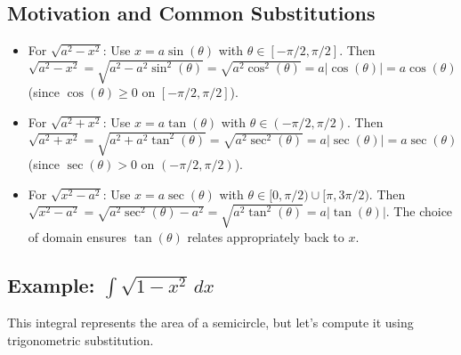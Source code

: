 \documentclass[11pt]{article}
\theoremstyle{definition}
\theoremstyle{remark}
\begin{document}
\subsection{Motivation and Common Substitutions}
\begin{itemize}
    \item For $\sqrt{a^2-x^2}$: Use $x = a\sin(\theta)$ with $\theta \in [-\pi/2, \pi/2]$. Then $\sqrt{a^2-x^2} = \sqrt{a^2-a^2\sin^2(\theta)} = \sqrt{a^2\cos^2(\theta)} = a|\cos(\theta)| = a\cos(\theta)$ (since $\cos(\theta) \ge 0$ on $[-\pi/2, \pi/2]$).
    \item For $\sqrt{a^2+x^2}$: Use $x = a\tan(\theta)$ with $\theta \in (-\pi/2, \pi/2)$. Then $\sqrt{a^2+x^2} = \sqrt{a^2+a^2\tan^2(\theta)} = \sqrt{a^2\sec^2(\theta)} = a|\sec(\theta)| = a\sec(\theta)$ (since $\sec(\theta) > 0$ on $(-\pi/2, \pi/2)$).
    \item For $\sqrt{x^2-a^2}$: Use $x = a\sec(\theta)$ with $\theta \in [0, \pi/2) \cup [\pi, 3\pi/2)$. Then $\sqrt{x^2-a^2} = \sqrt{a^2\sec^2(\theta)-a^2} = \sqrt{a^2\tan^2(\theta)} = a|\tan(\theta)|$. The choice of domain ensures $\tan(\theta)$ relates appropriately back to $x$.
\end{itemize}

\subsection{Example: \texorpdfstring{$\int \sqrt{1-x^2} \, dx$}{Integral of sqrt(1-x\^{}2) dx}}

This integral represents the area of a semicircle, but let's compute it using trigonometric substitution.
\end{document}
